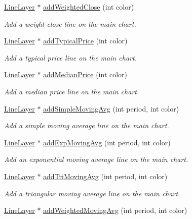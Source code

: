 \begin{DoxyCompactItemize}
\hyperlink{class_line_layer}{Line\+Layer} $\ast$ \hyperlink{class_finance_chart_a667247474a92a187877d74ee674f1250}{add\+Weighted\+Close} (int color)
\begin{DoxyCompactList}\small\item\em Add a weight close line on the main chart. \end{DoxyCompactList}\item 
\hyperlink{class_line_layer}{Line\+Layer} $\ast$ \hyperlink{class_finance_chart_a5ca57264dde9060ca5a59f60303f1e75}{add\+Typical\+Price} (int color)
\begin{DoxyCompactList}\small\item\em Add a typical price line on the main chart. \end{DoxyCompactList}\item 
\hyperlink{class_line_layer}{Line\+Layer} $\ast$ \hyperlink{class_finance_chart_a3957929ae30662dcfa410c1a2263bb92}{add\+Median\+Price} (int color)
\begin{DoxyCompactList}\small\item\em Add a median price line on the main chart. \end{DoxyCompactList}\item 
\hyperlink{class_line_layer}{Line\+Layer} $\ast$ \hyperlink{class_finance_chart_a7fdf86b7ceb129bd035612be20fbe6ba}{add\+Simple\+Moving\+Avg} (int period, int color)
\begin{DoxyCompactList}\small\item\em Add a simple moving average line on the main chart. \end{DoxyCompactList}\item 
\hyperlink{class_line_layer}{Line\+Layer} $\ast$ \hyperlink{class_finance_chart_a54fbce37c95280f028de248eb6681ea0}{add\+Exp\+Moving\+Avg} (int period, int color)
\begin{DoxyCompactList}\small\item\em Add an exponential moving average line on the main chart. \end{DoxyCompactList}\item 
\hyperlink{class_line_layer}{Line\+Layer} $\ast$ \hyperlink{class_finance_chart_a1cc644d76bda3086c2c9bf1fbd98d8cd}{add\+Tri\+Moving\+Avg} (int period, int color)
\begin{DoxyCompactList}\small\item\em Add a triangular moving average line on the main chart. \end{DoxyCompactList}\item 
\hyperlink{class_line_layer}{Line\+Layer} $\ast$ \hyperlink{class_finance_chart_a9358bbba0b86affbe33cf44fa8cfe824}{add\+Weighted\+Moving\+Avg} (int period, int color)

\end{DoxyCompactItemize}
